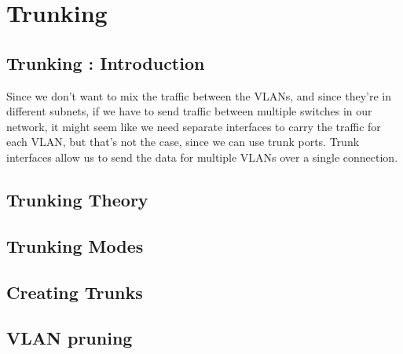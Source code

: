 \chapter{Trunking}

\section{Trunking : Introduction}
Since we don't want to mix the traffic between the VLANs, and since they're in different subnets, if we have to send traffic between multiple switches in our network, it might seem like we need separate interfaces to carry the traffic for each VLAN, but that's not the case, since we can use trunk ports. Trunk interfaces allow us to send the data for multiple VLANs over a single connection. 

\section{Trunking Theory}


\section{Trunking Modes}


\section{Creating Trunks}


\section{VLAN pruning}


